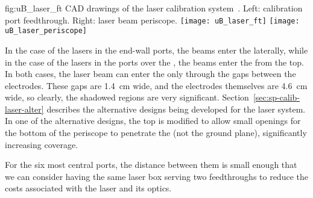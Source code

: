 \begin{dunefigure}{fig:uB_laser_ft}
{CAD drawings of the  laser calibration system~\cite{microboone}. Left: calibration port feedthrough. Right: laser beam periscope. %
}
\texttt{[image: uB\_laser\_ft]}
\texttt{[image: uB\_laser\_periscope]}
\end{dunefigure}


In the case of the lasers in the end-wall ports, the beams enter the  laterally, while in the case of the lasers in the ports over the , the beams enter the  from the top. In both cases, the laser beam can enter the  only through the gaps between the  electrodes. These gaps are \SI{1.4}{\cm} wide, and the electrodes themselves are \SI{4.6}{\cm} wide, so clearly, the shadowed regions are very significant. Section~\ref{sec:sp-calib-laser-alter} describes the alternative designs being developed for the laser system. In one of the alternative designs, the top  is modified to allow small openings for the bottom of the periscope to penetrate %
the  (not the ground plane), significantly increasing coverage.

For the six most central ports, the distance between them is small enough that we can consider having the same laser box serving two feedthroughs to reduce the costs associated with the laser and its optics.


